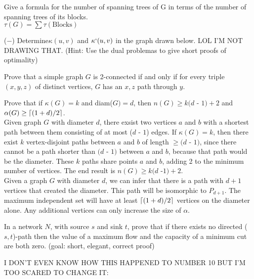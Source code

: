 \documentclass[12pt]{article}
\DeclarePairedDelimiter{\ceil}{\lceil}{\rceil}
\newenvironment{question}[2][Question]{\begin{trivlist}
\item[\hskip \labelsep {\bfseries #1}\hskip \labelsep {\bfseries #2.}]}{\end{trivlist}}
\begin{document}
\begin{question}{5}
	Give a formula for the number of spanning trees of G in terms of the number of spanning trees of its blocks.	\\
	$\tau(G) = \sum{\tau(\text{Blocks})}$
\end{question}

\begin{question}{6}
($-$) Determine$\kappa(u,v)$ and $\kappa`(u,v)$ in the graph drawn below. LOL I'M NOT DRAWING THAT. (Hint: Use the dual problemas to give short proofs of optimality)
\end{question}

\begin{question}{7}
Prove that a simple graph $G$ is 2-connected if and only if for every triple $(x, y, z)$ of distinct vertices, $G$ has an $x, z$ path through $y$.
\end{question}

\begin{question}{8}
Prove that if $\kappa(G) = k$ and diam($G) = d$, then $n(G) \geq k(d$ - $ 1) + 2$ and $\alpha(G) \geq \ceil[big]{(1 + d)/2}$.
\\
Given graph $G$ with diameter $d$, there exsist two vertices $a$ and $b$ with a shortest path between them consisting of at most ($d$ - $1$) edges.  If $\kappa(G) = k$, then there exist $k$ vertex-disjoint paths between $a$ and $b$ of length $\geq (d$ - $1)$, since there cannot be a path shorter than $(d$ - $1)$ between $a$ and $b$, because that path would be the diameter.  These $k$ paths share points $a$ and $b$, adding 2 to the minimum number of vertices.  The end result is $n(G) \geq k(d$ -$1) +2$.  \\

\noindent
Given a graph $G$ with diameter $d$, we can infer that there is a path with $d+1$ vertices that created the diameter.  This path will be isomorphic to $P_{d+1}$.  The maximum independent set will have at least $\ceil[big]{(1 + d)/2}$ vertices on the diameter alone.  Any additional vertices can only increase the size of $\alpha$.



\end{question}

\begin{question}{9}
In a network $N$, with source $s$ and sink $t$, prove that if there exists no directed ($s, t$)-path then the value of a maximum flow and the capacity of a minimum cut are both zero. (goal: short,
elegant, correct proof)
\end{question}
\color{red}
\huge I DON'T EVEN KNOW HOW THIS HAPPENED TO NUMBER 10 BUT I'M TOO SCARED TO CHANGE IT:
\normalsize \color{black}
\end{document}
